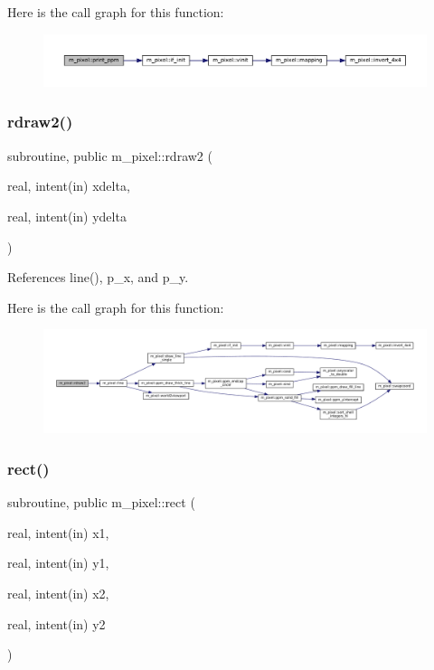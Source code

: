 Here is the call graph for this function\+:
\nopagebreak
\begin{figure}[H]
\begin{center}
\leavevmode
\includegraphics[width=350pt]{namespacem__pixel_a01797b04ce7c693c3fd6a841e8d1de48_cgraph}
\end{center}
\end{figure}
\mbox{\label{namespacem__pixel_a664375b036092dbebe1bccdc67254e1d}} 
\subsubsection{\texorpdfstring{rdraw2()}{rdraw2()}}
{\footnotesize\ttfamily subroutine, public m\+\_\+pixel\+::rdraw2 (\begin{DoxyParamCaption}\item[{real, intent(in)}]{xdelta,  }\item[{real, intent(in)}]{ydelta }\end{DoxyParamCaption})}



References line(), p\+\_\+x, and p\+\_\+y.

Here is the call graph for this function\+:
\nopagebreak
\begin{figure}[H]
\begin{center}
\leavevmode
\includegraphics[width=350pt]{namespacem__pixel_a664375b036092dbebe1bccdc67254e1d_cgraph}
\end{center}
\end{figure}
\mbox{\label{namespacem__pixel_a5435aa0d9d6048a62c09d7d90665b958}} 
\subsubsection{\texorpdfstring{rect()}{rect()}}
{\footnotesize\ttfamily subroutine, public m\+\_\+pixel\+::rect (\begin{DoxyParamCaption}\item[{real, intent(in)}]{x1,  }\item[{real, intent(in)}]{y1,  }\item[{real, intent(in)}]{x2,  }\item[{real, intent(in)}]{y2 }\end{DoxyParamCaption})}



